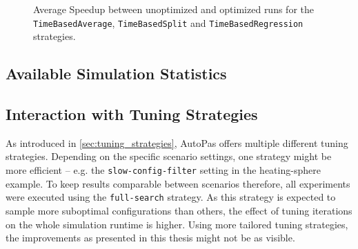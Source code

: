 \begin{figure}[htpb]
	\centering
	\caption{Average Speedup between unoptimized and optimized runs for the \texttt{TimeBasedAverage}, \texttt{TimeBasedSplit} and \texttt{TimeBasedRegression} strategies.}
	\label{fig:optimization_speedup}
\end{figure}

\subsection{Available Simulation Statistics}

\subsection{Interaction with Tuning Strategies}
As introduced in \autoref{sec:tuning_strategies}, AutoPas offers multiple different tuning strategies. Depending on the specific scenario settings, one strategy might be more efficient -- e.g. the \texttt{slow-config-filter} setting in the heating-sphere example. To keep results comparable between scenarios therefore, all experiments were executed using the \texttt{full-search} strategy. As this strategy is expected to sample more suboptimal configurations than others, the effect of tuning iterations on the whole simulation runtime is higher. Using more tailored tuning strategies, the improvements as presented in this thesis might not be as visible.

